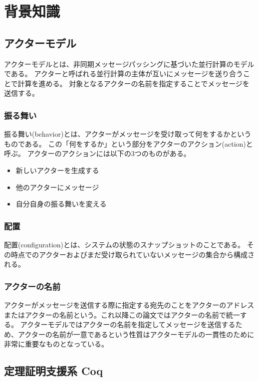 \chapter{背景知識}

\section{アクターモデル}

アクターモデルとは、非同期メッセージパッシングに基づいた並行計算のモデルである。
アクターと呼ばれる並行計算の主体が互いにメッセージを送り合うことで計算を進める。
対象となるアクターの名前を指定することでメッセージを送信する。


\subsection{振る舞い}

振る舞い(behavior)とは、アクターがメッセージを受け取って何をするかというものである。
この「何をするか」という部分をアクターのアクション(action)と呼ぶ。
アクターのアクションには以下の3つのものがある。

\begin{itemize}
\item 新しいアクターを生成する
\item 他のアクターにメッセージ
\item 自分自身の振る舞いを変える
\end{itemize}


\subsection{配置}

配置(configuration)とは、システムの状態のスナップショットのことである。
その時点でのアクターおよびまだ受け取られていないメッセージの集合から構成される。

\subsection{アクターの名前}

アクターがメッセージを送信する際に指定する宛先のことをアクターのアドレスまたはアクターの名前という。これ以降この論文ではアクターの名前で統一する。
アクターモデルではアクターの名前を指定してメッセージを送信するため、アクターの名前が一意であるという性質はアクターモデルの一貫性のために非常に重要なものとなっている。


\section{定理証明支援系 Coq}

